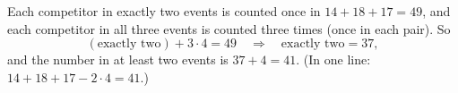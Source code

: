Each competitor in exactly two events is counted once in $14+18+17=49$, and each competitor in all three events is counted three times (once in each pair). So
\[(\text{exactly two})+3\cdot4=49\quad\Longrightarrow\quad\text{exactly two}=37,\]
and the number in at least two events is $37+4=\boxed{41}$. (In one line: $14+18+17-2\cdot4=41$.)
